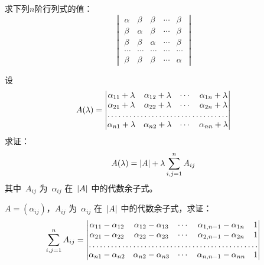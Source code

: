 \documentclass[twoside,openright]{book}
\begin{document}
\begin{CJK*}{UTF8}{}
\begin{quest}
\label{quest:99}
求下列$n$阶行列式的值：
\[
\begin{vmatrix}
\alpha          & \beta           & \beta           & \cdots & \beta             \\
\beta           & \alpha          & \beta           & \cdots & \beta             \\
\beta           & \beta           & \alpha          & \cdots & \beta             \\
\cdots          & \cdots          & \cdots          & \cdots & \cdots            \\
\beta           & \beta           & \beta           & \cdots & \alpha
\end{vmatrix}
\]
\end{quest}

\begin{quest}
\label{quest:100}
设
\[
A(\lambda)=
\begin{vmatrix}
\alpha_{11}+\lambda & \alpha_{12}+\lambda & \cdots & \alpha_{1n}+\lambda \\
\alpha_{21}+\lambda & \alpha_{22}+\lambda & \cdots & \alpha_{2n}+\lambda \\
\hdotsfor{4}                                                             \\
\alpha_{n1}+\lambda & \alpha_{n2}+\lambda & \cdots & \alpha_{nn}+\lambda
\end{vmatrix}
\]
求证：
\[
A(\lambda)=\lvert{A}\rvert+\lambda\sum_{i,j=1}^nA_{ij}
\]
其中\ $A_{ij}$ 为\ $\alpha_{ij}$ 在\ $\lvert{A}\rvert$ 中的代数余子式。
\end{quest}

\begin{quest}
\label{quest:101}
$A=(\alpha_{ij})$，$A_{ij}$ 为\ $\alpha_{ij}$ 在\ $\lvert{A}\rvert$ 中的代数余子式，求证：
\[
\sum_{i,j=1}^nA_{ij}=
\begin{vmatrix}
\alpha_{11}-\alpha_{12} & \alpha_{12}-\alpha_{13} & \cdots & \alpha_{1,n-1}-\alpha_{1n} & 1 \\
\alpha_{21}-\alpha_{22} & \alpha_{22}-\alpha_{23} & \cdots & \alpha_{2,n-1}-\alpha_{2n} & 1 \\
\hdotsfor{5}                                                                                \\
\alpha_{n1}-\alpha_{n2} & \alpha_{n2}-\alpha_{n3} & \cdots & \alpha_{n,n-1}-\alpha_{nn} & 1
\end{vmatrix}
\]
\end{quest}


\end{CJK*}
\end{document}
